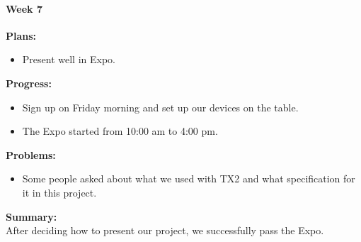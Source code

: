 \paragraph{Week 7}
\begin{adjustwidth}{2.5em}{0pt}
    \vspace{-0.5cm}\textbf{Plans:}
    \vspace{-0.5cm}
    \begin{itemize}
        \item Present well in Expo.
    \end{itemize} 
    \vspace{-0.3cm}\textbf{Progress:}
    \vspace{-0.5cm}
    \begin{itemize}
        \item Sign up on Friday morning and set up our devices on the table. 
        \item The Expo started from 10:00 am to 4:00 pm.
    \end{itemize} 
    \vspace{-0.3cm}\textbf{Problems:}
    \vspace{-0.5cm}
    \begin{itemize}
        \item Some people asked about what we used with TX2 and what specification for it in this project.
    \end{itemize}  
    \vspace{-0.3cm}\noindent\textbf{Summary:}\\
    \noindent After deciding how to present our project, we successfully pass the Expo.
\end{adjustwidth} 